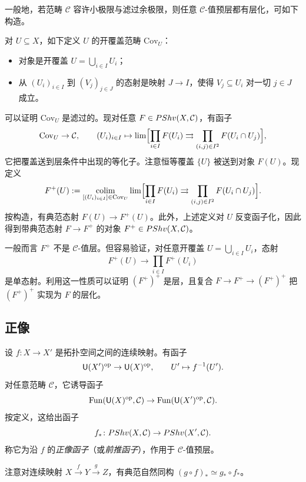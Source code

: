 \begin{remark}\label{rem:3.1.7}
一般地，若范畴 $\mathcal C$ 容许小极限与滤过余极限，则任意 $\mathcal C$-值预层都有层化，可如下构造。

对 $U\subseteq X$，如下定义 $U$ 的开覆盖范畴 $\mathrm{Cov}_U$：
\begin{itemize}
  \item 对象是开覆盖 $U=\bigcup_{i\in I}U_i$；
  \item 从 $(U_i)_{i\in I}$ 到 $(V_j)_{j\in J}$ 的态射是映射 $J\to I$，使得 $V_j\subseteq U_i$ 对一切 $j\in J$ 成立。
\end{itemize}
可以证明 $\mathrm{Cov}_U$ 是滤过的。现对任意 $F\in PShv(X,\mathcal C)$，有函子
\[
\mathrm{Cov}_U\to\mathcal C,\qquad (U_i)_{i\in I}\mapsto\lim\Bigl[\prod_{i\in I}F(U_i)\rightrightarrows\prod_{(i,j)\in I^2}F(U_i\cap U_j)\Bigr],
\]
它把覆盖送到层条件中出现的等化子。注意恒等覆盖 $\{U\}$ 被送到对象 $F(U)$。现定义
\[
F^{+}(U):=\operatorname*{colim}_{[(U_i)_{i\in I}]\in\mathrm{Cov}_U}\lim\Bigl[\prod_{i\in I}F(U_i)\rightrightarrows\prod_{(i,j)\in I^2}F(U_i\cap U_j)\Bigr].
\]
按构造，有典范态射 $F(U)\to F^{+}(U)$。此外，上述定义对 $U$ 反变函子化，因此得到带典范态射 $F\to F^{+}$ 的对象 $F^{+}\in PShv(X,\mathcal C)$。

一般而言 $F^{+}$ 不是 $\mathcal C$-值层。但容易验证，对任意开覆盖 $U=\bigcup_{i\in I}U_i$，态射
\[
F^{+}(U)\to\prod_{i\in I}F^{+}(U_i)
\]
是单态射。利用这一性质可以证明 $(F^{+})^{+}$ 是层，且复合 $F\to F^{+}\to(F^{+})^{+}$ 把 $(F^{+})^{+}$ 实现为 $F$ 的层化。
\end{remark}

\subsection{正像}\label{sec:3.2}

\begin{construction}\label{con:3.2.1}
设 $f\colon X\to X'$ 是拓扑空间之间的连续映射。有函子
\[
\mathsf{U}(X')^{\mathrm{op}}\to\mathsf{U}(X)^{\mathrm{op}},\qquad U'\mapsto f^{-1}(U').
\]
对任意范畴 $\mathcal C$，它诱导函子
\[
\operatorname{Fun}(\mathsf{U}(X)^{\mathrm{op}},\mathcal C)\to\operatorname{Fun}(\mathsf{U}(X')^{\mathrm{op}},\mathcal C).
\]
按定义，这给出函子
\[
f_*\colon PShv(X,\mathcal C)\to PShv(X',\mathcal C).
\]
称它为沿 $f$ 的\emph{正像函子}（或\emph{前推函子}），作用于 $\mathcal C$-值预层。
\end{construction}

注意对连续映射 $X\xrightarrow{\ f\ }Y\xrightarrow{\ g\ }Z$，有典范自然同构 $(g\circ f)_*\simeq g_*\circ f_*$。

